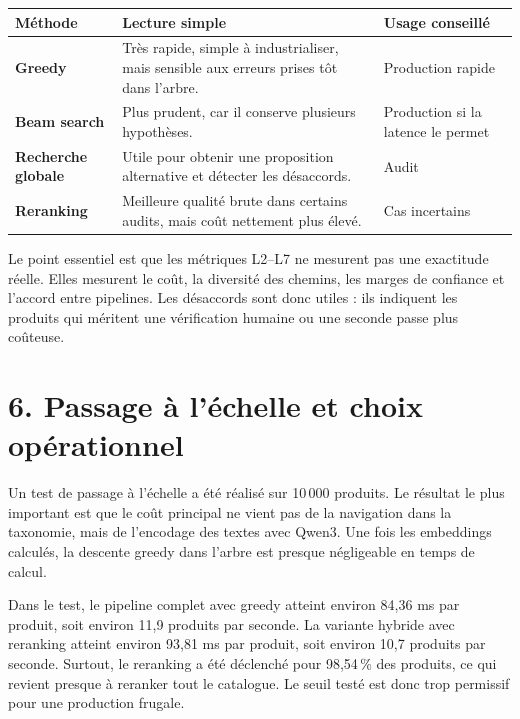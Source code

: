 \documentclass[11pt,a4paper]{article}
\begin{document}
\begin{center}
\begin{tabularx}{0.96\textwidth}{>{\bfseries\RaggedRight\arraybackslash}p{3.5cm}>{\RaggedRight\arraybackslash}X>{\RaggedLeft\arraybackslash}p{2.4cm}}
\toprule
Méthode & Lecture simple & Usage conseillé \\
\midrule
Greedy & Très rapide, simple à industrialiser, mais sensible aux erreurs prises tôt dans l'arbre. & Production rapide \\
Beam search & Plus prudent, car il conserve plusieurs hypothèses. & Production si la latence le permet \\
Recherche globale & Utile pour obtenir une proposition alternative et détecter les désaccords. & Audit \\
Reranking & Meilleure qualité brute dans certains audits, mais coût nettement plus élevé. & Cas incertains \\
\bottomrule
\end{tabularx}
\end{center}

Le point essentiel est que les métriques L2--L7 ne mesurent pas une exactitude réelle. Elles mesurent le coût, la diversité des chemins, les marges de confiance et l'accord entre pipelines. Les désaccords sont donc utiles : ils indiquent les produits qui méritent une vérification humaine ou une seconde passe plus coûteuse.

\newpage

\section*{6. Passage à l'échelle et choix opérationnel}

Un test de passage à l'échelle a été réalisé sur 10\,000 produits. Le résultat le plus important est que le coût principal ne vient pas de la navigation dans la taxonomie, mais de l'encodage des textes avec Qwen3. Une fois les embeddings calculés, la descente greedy dans l'arbre est presque négligeable en temps de calcul.

Dans le test, le pipeline complet avec greedy atteint environ 84{,}36 ms par produit, soit environ 11{,}9 produits par seconde. La variante hybride avec reranking atteint environ 93{,}81 ms par produit, soit environ 10{,}7 produits par seconde. Surtout, le reranking a été déclenché pour 98{,}54\,\% des produits, ce qui revient presque à reranker tout le catalogue. Le seuil testé est donc trop permissif pour une production frugale.
\end{document}
